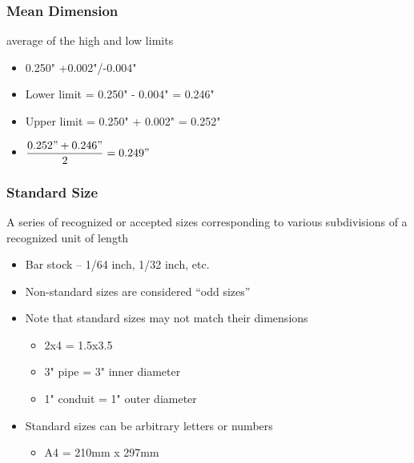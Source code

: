 \begin{frame}
	\frametitle{Mean Dimension}
    \begin{description}[<+- | alert@+>]
        \item[Mean Dimension]{average of the high and low limits}
            \begin{itemize}
                \item{0.250" +0.002"/-0.004"}
                \item{Lower limit = 0.250" - 0.004" = 0.246"}
                \item{Upper limit = 0.250" + 0.002" = 0.252"}
                \item{$\dfrac{0.252"+0.246"}{2}=0.249"$}
            \end{itemize}
    \end{description}    
\end{frame}

\begin{frame}
	\frametitle{Standard Size}

    A series of recognized or accepted sizes corresponding to various subdivisions of a recognized unit of length

    \begin{itemize}[<+- | alert@+>]
        \item Bar stock -- 1/64 inch, 1/32 inch, etc.
        \item Non-standard sizes are considered ``odd sizes''
        \item Note that standard sizes may not match their dimensions
        \begin{itemize}
            \item[Lumber] 2x4 = 1.5x3.5
            \item[Plumbing] 3" pipe = 3" inner diameter
            \item[Conduit] 1" conduit = 1" outer diameter  
        \end{itemize}
        \item Standard sizes can be arbitrary letters or numbers
            \begin{itemize}
                \item[Paper] A4 = 210mm x 297mm
            \end{itemize}
    \end{itemize}   
\end{frame}


